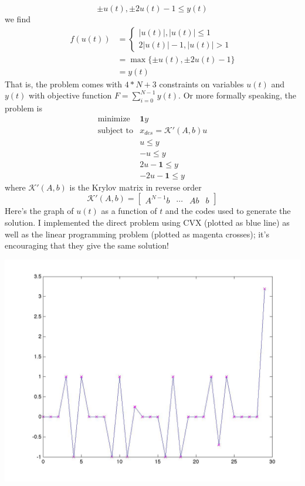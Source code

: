 \documentclass[12pt,a4paper]{article}
\renewcommand{\l}{\left}\renewcommand{\r}{\right}
\newcommand{\casebrak}[2]{\left \{ \begin{array}{l} {#1}\\{#2} \end{array} \right.}
\newcommand{\SUM}[2]{\sum\limits_{#1}^{#2}}
\begin{document}
$$\pm u(t), \pm 2u(t)-1 \leq y(t)$$
we find 
\begin{align*}
f(u(t)) &= \casebrak{|u(t)|, |u(t)| \leq 1}{2|u(t)|-1, |u(t)|>1}\\
&= \max\{\pm u(t), \pm 2u(t)-1 \} \\
&= y(t)
\end{align*}
That is, the problem comes with $4*N + 3$ constraints on variables $u(t)$ and $y(t)$ with objective function $F = \SUM{i=0}{N-1} y(t)$. Or more formally speaking, the problem is 
$$\begin{array}{rl}
\mbox{minimize} & \mathbf{1}y\\
\mbox{subject to} & x_{des} = \mathcal K'(A,b)u\\
& u \leq y\\
& -u \leq y\\
& 2u-\mathbf{1} \leq y\\
& -2u - \mathbf{1} \leq y
\end{array}$$
where $\mathcal{K}'(A, b)$ is the Krylov matrix in reverse order
$$\mathcal K'(A, b) = \l[\begin{array}{cccc}
A^{N-1}b & \cdots & Ab & b
\end{array}\r]$$
Here's the graph of $u(t)$ as a function of $t$ and the codes used to generate the solution. I implemented the direct problem using CVX (plotted as blue line) as well as the linear programming problem (plotted as magenta crosses); it's encouraging that they give the same solution! 
\begin{center}
\includegraphics[scale=0.3]{hw3_p317.jpg}
\end{center}
\end{document}
